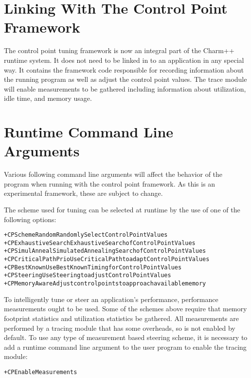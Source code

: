 \section{Linking With The Control Point Framework}

The control point tuning framework is now an integral part of the Charm++ runtime system. It does not need to be linked in to an application in any special way. It contains the framework code responsible for recording information about the running program as well as adjust the control point values. The trace module will enable measurements to be gathered including information about utilization, idle time, and memory usage. 

\section{Runtime Command Line Arguments}

Various following command line arguments will affect the behavior of the program when running with the control point framework. As this is an experimental framework, these are subject to change.

The scheme used for tuning can be selected at runtime by the use of one of the following options:
\begin{alltt} 
     +CPSchemeRandom            Randomly Select Control Point Values
 +CPExhaustiveSearch            Exhaustive Search of Control Point Values
      +CPSimulAnneal            Simulated Annealing Search of Control Point Values
 +CPCriticalPathPrio            Use Critical Path to adapt Control Point Values
        +CPBestKnown            Use BestKnown Timing for Control Point Values
         +CPSteering            Use Steering to adjust Control Point Values
      +CPMemoryAware            Adjust control points to approach available memory
\end{alltt} 

To intelligently tune or steer an application's performance, performance measurements ought to be used. Some of the schemes above require that memory footprint statistics and utilization statistics be gathered. All measurements are performed by a tracing module that has some overheads, so is not enabled by default. To use any type of measurement based steering scheme, it is necessary to add a runtime command line argument to the user program to enable the tracing module:

\begin{alltt} 
    +CPEnableMeasurements
\end{alltt}


